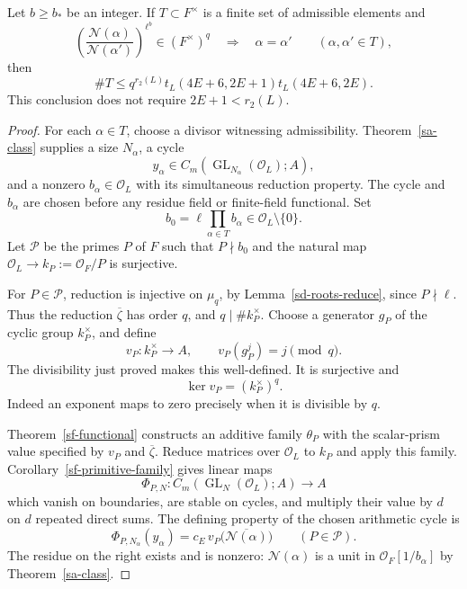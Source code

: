 \begin{theorem}\label{sw-few}
Let \(b\ge b_*\) be an integer.  If \(T\subset F^\times\)
is a finite set of admissible elements and
\[
 \left(\frac{\mathcal N(\alpha)}{\mathcal N(\alpha')}
              \right)^{\ell^b}\in(F^\times)^q
          \quad\Longrightarrow\quad\alpha=\alpha'
                       \qquad(\alpha,\alpha'\in T),
 \tag{SW3}
\]
then
\[
 \#T\le q^{r_2(L)}
           t_L(4E+6,2E+1)t_L(4E+6,2E).
 \tag{SW4}
\]
This conclusion does not require \(2E+1<r_2(L)\).
\end{theorem}
\begin{proof}
For each \(\alpha\in T\), choose a divisor witnessing
admissibility.  Theorem~\ref{sa-class} supplies a size
\(N_\alpha\), a cycle
\[
 y_\alpha\in C_m(\operatorname{GL}_{N_\alpha}
                           (\mathcal O_L);A),
\]
and a nonzero \(b_\alpha\in\mathcal O_L\) with its
simultaneous reduction property.  The cycle and
\(b_\alpha\) are chosen before any residue field or
finite-field functional.  Set
\[
                  b_0=\ell\prod_{\alpha\in T}b_\alpha
                         \in\mathcal O_L\setminus\{0\}.
\]
Let \(\mathcal P\) be the primes \(P\) of \(F\)
such that \(P\nmid b_0\) and the natural map
\(\mathcal O_L\to k_P:=\mathcal O_F/P\) is
surjective.

For \(P\in\mathcal P\), reduction is injective on
\(\mu_q\), by Lemma~\ref{sd-roots-reduce}, since
\(P\nmid\ell\).  Thus the reduction \(\overline\zeta\)
has order \(q\), and \(q\mid\#k_P^\times\).
Choose a generator \(g_P\) of the cyclic group
\(k_P^\times\), and define
\[
      v_P:k_P^\times\longrightarrow A,
                       \qquad v_P(g_P^j)=j\pmod q.
\]
The divisibility just proved makes this well-defined.
It is surjective and
\[
                         \ker v_P=(k_P^\times)^q.
 \tag{SW5}
\]
Indeed an exponent maps to zero precisely when it is
divisible by \(q\).

Theorem~\ref{sf-functional} constructs an additive
family \(\theta_P\) with the scalar-prism value
specified by \(v_P\) and \(\overline\zeta\).
Reduce matrices over \(\mathcal O_L\) to \(k_P\)
and apply this family.  Corollary~\ref{sf-primitive-family}
gives linear maps
\[
 \Phi_{P,N}:C_m(\operatorname{GL}_N(\mathcal O_L);A)
                                     \longrightarrow A
\]
which vanish on boundaries, are stable on cycles,
and multiply their value by \(d\) on \(d\) repeated
direct sums.  The defining property of the chosen
arithmetic cycle is
\[
 \Phi_{P,N_\alpha}(y_\alpha)
     =c_E\,v_P\bigl(\overline{\mathcal N(\alpha)}\bigr)
                              \qquad(P\in\mathcal P).
 \tag{SW6}
\]
The residue on the right exists and is nonzero:
\(\mathcal N(\alpha)\) is a unit in
\(\mathcal O_F[1/b_\alpha]\) by
Theorem~\ref{sa-class}.


\end{proof}
